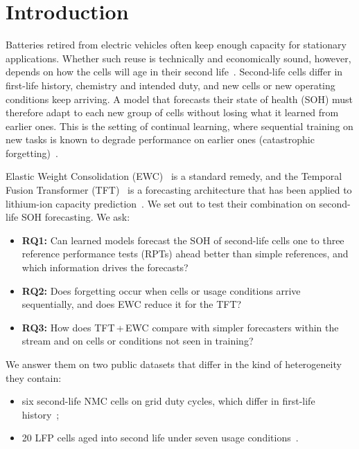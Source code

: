 \section{Introduction}
\label{sec:intro}

Batteries retired from electric vehicles often keep enough capacity for stationary applications. Whether such reuse is technically and economically sound, however, depends on how the cells will age in their second life~\cite{martinezlaserna2018,hossain2019,borner2022,canalscasals2019}. Second-life cells differ in first-life history, chemistry and intended duty, and new cells or new operating conditions keep arriving. A model that forecasts their state of health (SOH) must therefore adapt to each new group of cells without losing what it learned from earlier ones. This is the setting of continual learning, where sequential training on new tasks is known to degrade performance on earlier ones (catastrophic forgetting)~\cite{parisi2019,vandeven2025continual}.

Elastic Weight Consolidation (EWC)~\cite{kirkpatrick2017ewc} is a standard remedy, and the Temporal Fusion Transformer (TFT)~\cite{lim2021tft} is a forecasting architecture that has been applied to lithium-ion capacity prediction~\cite{gomez2024tft}. We set out to test their combination on second-life SOH forecasting. We ask:
\begin{itemize}
  \item \textbf{RQ1:} Can learned models forecast the SOH of second-life cells one to three reference performance tests (RPTs) ahead better than simple references, and which information drives the forecasts?
  \item \textbf{RQ2:} Does forgetting occur when cells or usage conditions arrive sequentially, and does EWC reduce it for the TFT?
  \item \textbf{RQ3:} How does TFT\,+\,EWC compare with simpler forecasters within the stream and on cells or conditions not seen in training?
\end{itemize}

We answer them on two public datasets that differ in the kind of heterogeneity they contain:
\begin{itemize}
  \item six second-life NMC cells on grid duty cycles, which differ in first-life history~\cite{moy2024secondlife};
  \item 20 LFP cells aged into second life under seven usage conditions~\cite{wheeler2025lfp}.
\end{itemize}

